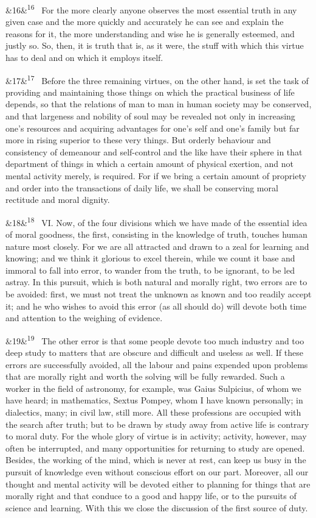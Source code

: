 \documentclass[12pt]{article}
\newcommand{\para}[1][]{\par\noindent\ifx&#1&\else\textsuperscript{\footnotesize #1}~\fi}
\begin{document}
\para[16] For the more clearly anyone observes the most essential truth in any given case and the more quickly and accurately he can see and explain the reasons for it, the more understanding and wise he is generally esteemed, and justly so. So, then, it is truth that is, as it were, the stuff with which this virtue has to deal and on which it employs itself.

\para[17] Before the three remaining virtues, on the other hand, is set the task of providing and maintaining those things on which the practical business of life depends, so that the relations of man to man in human society may be conserved, and that largeness and nobility of soul may be revealed not only in increasing one's resources and acquiring advantages for one's self and one's family but far more in rising superior to these very things. But orderly behaviour and consistency of demeanour and self-control and the like have their sphere in that department of things in which a certain amount of physical exertion, and not mental activity merely, is required. For if we bring a certain amount of propriety and order into the transactions of daily life, we shall be conserving moral rectitude and moral dignity.

\para[18] VI. Now, of the four divisions which we have made of the essential idea of moral goodness, the first, consisting in the knowledge of truth, touches human nature most closely. For we are all attracted and drawn to a zeal for learning and knowing; and we think it glorious to excel therein, while we count it base and immoral to fall into error, to wander from the truth, to be ignorant, to be led astray. In this pursuit, which is both natural and morally right, two errors are to be avoided: first, we must not treat the unknown as known and too readily accept it; and he who wishes to avoid this error (as all should do) will devote both time and attention to the weighing of evidence.

\para[19] The other error is that some people devote too much industry and too deep study to matters that are obscure and difficult and useless as well. If these errors are successfully avoided, all the labour and pains expended upon problems that are morally right and worth the solving will be fully rewarded. Such a worker in the field of astronomy, for example, was Gaius Sulpicius, of whom we have heard; in mathematics, Sextus Pompey, whom I have known personally; in dialectics, many; in civil law, still more. All these professions are occupied with the search after truth; but to be drawn by study away from active life is contrary to moral duty. For the whole glory of virtue is in activity; activity, however, may often be interrupted, and many opportunities for returning to study are opened. Besides, the working of the mind, which is never at rest, can keep us busy in the pursuit of knowledge even without conscious effort on our part. Moreover, all our thought and mental activity will be devoted either to planning for things that are morally right and that conduce to a good and happy life, or to the pursuits of science and learning. With this we close the discussion of the first source of duty.
\end{document}
